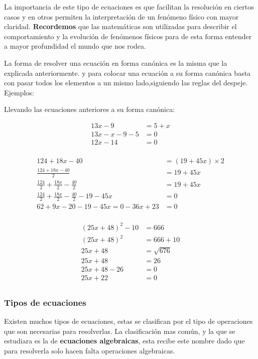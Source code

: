     La importancia de este tipo de ecuaciones es que facilitan la resolución en
    ciertos casos y en otros permiten la interpretación de un fenómeno físico con
    mayor claridad. \textbf{Recordemos} que las matemáticas son utilizadas para
    describir el comportamiento y la evolución de fenómenos físicos para de esta
    forma entender a mayor profundidad el mundo que nos rodea.

    La forma de resolver una ecuación en forma canónica es la misma que la
    explicada anteriormente. y para colocar una ecuación a su forma canónica basta
    con pasar todos los elementos a un mismo lado,siguiendo las reglas del despeje.
    Ejemplos:

    Llevando las ecuaciones anteriores a su forma canónica:

    \begin{align*}
        13x - 9 &= 5 + x		\\
        13x -x -9 -5 &= 0\\
        12x -14 &= 0 \\
    \end{align*}

    \begin{align*}
        124 + 18x -40 &= (19+45x)\times2 		\\
        \frac{124+18x-40}{2}&= 19 + 45x\\
        \frac{124}{2} +\frac{18x}{2} - \frac{40}{2}  &= 19 +45x\\
        \frac{124}{2} +\frac{18x}{2} - \frac{40}{2} -19 -45x  &=0\\
        62+9x-20-19-45x=0
        -36x+23 &= 0\\
    \end{align*}

    \begin{align*}
        (25x + 48)^2 -10 &= 666 \\
        (25x + 48)^2  &= 666+10 \\
        25x +48 &= \sqrt{676}\\
        25x + 48 &= 26 \\
        25x +48 -26 &= 0 \\
        25x+22 &= 0\\
    \end{align*}

\subsubsection{Tipos de ecuaciones}
    Existen muchos tipos de ecuaciones, estas se clasifican por el tipo de operaciones
    que son necesarias para resolverlas. La clasificación mas común, y la que se
    estudiara es la de \textbf{ecuaciones algebraicas}, esta recibe este nombre
    dado que para resolverla solo hacen falta operaciones algebraicas.

